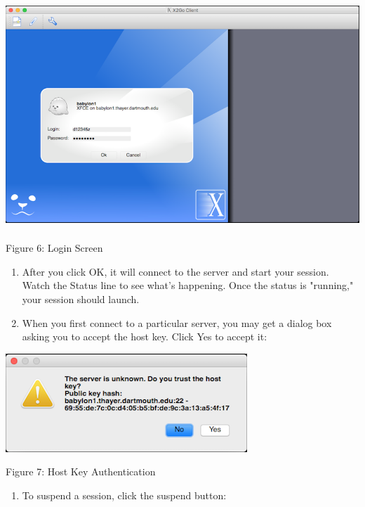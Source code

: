 \documentclass{article}
\begin{document}
\includegraphics[width=5.50787in,height=3.38189in]{images/media/image6.png}

Figure 6: Login Screen

\begin{enumerate}
\def\labelenumi{\arabic{enumi}.}
\setcounter{enumi}{10}
\item
  After you click OK, it will connect to the server and start your
  session. Watch the Status line to see what's happening. Once the
  status is "running," your session should launch.
\item
  When you first connect to a particular server, you may get a dialog
  box asking you to accept the host key. Click Yes to accept it:
\end{enumerate}

\includegraphics[width=3.58289in,height=1.45815in]{images/media/image7.png}

Figure 7: Host Key Authentication

\begin{enumerate}
\def\labelenumi{\arabic{enumi}.}
\setcounter{enumi}{12}
\item
  To suspend a session, click the suspend button:
\end{enumerate}
\end{document}
